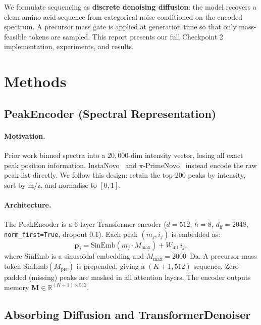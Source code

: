 \documentclass[11pt]{article}
\begin{document}
We formulate sequencing as \textbf{discrete denoising diffusion}: the model
recovers a clean amino acid sequence from categorical noise conditioned on the
encoded spectrum. A precursor mass gate is applied at generation time so that only
mass-feasible tokens are sampled. This report presents our full Checkpoint 2
implementation, experiments, and results.

\section{Methods}

\subsection{PeakEncoder (Spectral Representation)}

\paragraph{Motivation.}
Prior work binned spectra into a $20{,}000$-dim intensity vector, losing all exact
peak position information. InstaNovo~\cite{instanovo} and $\pi$-PrimeNovo~\cite{primenovo}
instead encode the raw peak list directly. We follow this design: retain the top-200
peaks by intensity, sort by m/z, and normalise to $[0,1]$.

\paragraph{Architecture.}
The PeakEncoder is a $6$-layer Transformer encoder ($d=512$, $h=8$, $d_\text{ff}=2048$,
\texttt{norm\_first=True}, dropout 0.1). Each peak $(m_j, i_j)$ is embedded as:
\begin{equation}
  \mathbf{p}_j = \mathrm{SinEmb}(m_j \cdot M_\text{max}) + W_\text{int}\,i_j,
\end{equation}
where $\mathrm{SinEmb}$ is a sinusoidal embedding and $M_\text{max}=2000$~Da.
A precursor-mass token $\mathrm{SinEmb}(M_\text{pre})$ is prepended, giving a
$(K{+}1, 512)$ sequence. Zero-padded (missing) peaks are masked in all attention layers.
The encoder outputs memory $\mathbf{M} \in \mathbb{R}^{(K+1)\times 512}$.

\subsection{Absorbing Diffusion and TransformerDenoiser}
\end{document}
